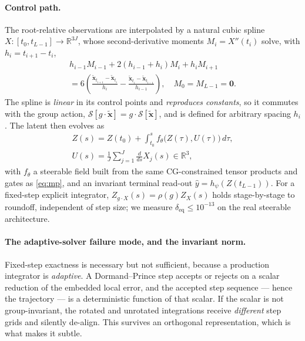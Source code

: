 \paragraph{Control path.} The root-relative observations are interpolated by a natural cubic spline
$X:[t_0,t_{L-1}]\to\mathbb{R}^{3J}$, whose second-derivative moments $M_i=X''(t_i)$ solve, with
$h_i=t_{i+1}-t_i$,
%
\begin{equation}
\label{eq:spline-moments}
\begin{gathered}
h_{i-1}M_{i-1}+2(h_{i-1}+h_i)M_i+h_iM_{i+1}\\
=6\!\left(\frac{\tilde{\bm{x}}_{t_{i+1}}-\tilde{\bm{x}}_{t_i}}{h_i}
-\frac{\tilde{\bm{x}}_{t_i}-\tilde{\bm{x}}_{t_{i-1}}}{h_{i-1}}\right),
\quad M_0=M_{L-1}=\bm{0}.
\end{gathered}
\end{equation}
%
The spline is \emph{linear} in its control points and \emph{reproduces constants}, so it commutes with
the group action, $\mathcal{S}[g\cdot\tilde{\bm{x}}]=g\cdot\mathcal{S}[\tilde{\bm{x}}]$, and is defined
for arbitrary spacing $h_i$. The latent then evolves as
%
\begin{equation}
\label{eq:cde}
\begin{gathered}
Z(s)=Z(t_0)+\int_{t_0}^{s}f_\theta\big(Z(\tau),U(\tau)\big)\,d\tau,\\[2pt]
U(s)=\frac1J\sum_{j=1}^{J}\frac{d}{ds}X_j(s)\in\mathbb{R}^3,
\end{gathered}
\end{equation}
%
with $f_\theta$ a steerable field built from the same CG-constrained tensor products and gates as
\eqref{eq:mp}, and an invariant terminal read-out $\hat y=h_\psi(Z(t_{L-1}))$. For a fixed-step
explicit integrator, $Z_{g\cdot X}(s)=\rho(g)Z_X(s)$ holds stage-by-stage to roundoff, independent of
step size; we measure $\delta_{\text{eq}}\le10^{-13}$ on the real steerable architecture.

\paragraph{The adaptive-solver failure mode, and the invariant norm.} Fixed-step exactness is
necessary but not sufficient, because a production integrator is \emph{adaptive}. A Dormand--Prince
step accepts or rejects on a scalar reduction of the embedded local error, and the accepted step
sequence --- hence the trajectory --- is a deterministic function of that scalar. If the scalar is not
group-invariant, the rotated and unrotated integrations receive \emph{different} step grids and
silently de-align. This survives an orthogonal representation, which is what makes it subtle.

